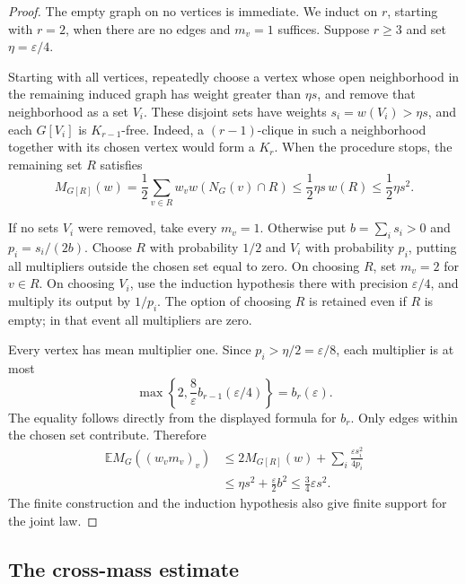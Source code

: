 \documentclass[11pt]{article}
\theoremstyle{definition}
\theoremstyle{remark}
\numberwithin{equation}{section}
\begin{document}
\begin{proof}
The empty graph on no vertices is immediate.  We induct on $r$, starting
with $r=2$, when there are no edges and $m_v=1$ suffices.  Suppose $r\ge3$
and set $\eta=\varepsilon/4$.

Starting with all vertices, repeatedly choose a vertex whose open
neighborhood in the remaining induced graph has weight greater than
$\eta s$, and remove that neighborhood as a set $V_i$.  These disjoint
sets have weights $s_i=w(V_i)>\eta s$, and each $G[V_i]$ is
$K_{r-1}$-free.  Indeed, a $(r-1)$-clique in such a neighborhood together
with its chosen vertex would form a $K_r$.  When the procedure stops,
the remaining set $R$ satisfies
\begin{equation}\label{eq:remainder-mass}
 M_{G[R]}(w)
 =\frac12\sum_{v\in R}w_vw(N_G(v)\cap R)
 \le\frac12\eta s\,w(R)\le\frac12\eta s^2.
\end{equation}

If no sets $V_i$ were removed, take every $m_v=1$.  Otherwise put
$b=\sum_i s_i>0$ and $p_i=s_i/(2b)$.  Choose $R$ with probability $1/2$
and $V_i$ with probability $p_i$, putting all multipliers outside the
chosen set equal to zero.  On choosing $R$, set $m_v=2$ for $v\in R$.
On choosing $V_i$, use the induction hypothesis there with precision
$\varepsilon/4$, and multiply its output by $1/p_i$.
The option of choosing $R$ is retained even if $R$ is empty; in that
event all multipliers are zero.

Every vertex has mean multiplier one.  Since
$p_i>\eta/2=\varepsilon/8$, each multiplier is at most
\[
 \max\left\{2,\frac8\varepsilon
                    b_{r-1}(\varepsilon/4)\right\}
 = b_r(\varepsilon).
\]
The equality follows directly from the displayed formula for $b_r$.
Only edges within the chosen set contribute.  Therefore
\begin{align*}
 \mathbb E M_G((w_vm_v)_v)
 &\le 2M_{G[R]}(w)
       +\sum_i\frac{\varepsilon s_i^2}{4p_i}\\
 &\le \eta s^2+\frac{\varepsilon}{2}b^2
 \le\frac34\varepsilon s^2.
\end{align*}
The finite construction and the induction hypothesis also give finite
support for the joint law.
\end{proof}

\subsection{The cross-mass estimate}
\end{document}
